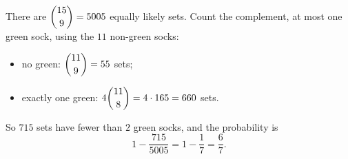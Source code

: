 There are $\dbinom{15}{9}=5005$ equally likely sets. Count the complement, at most one green sock, using the $11$ non-green socks:
\begin{itemize}
\item no green: $\dbinom{11}{9}=55$ sets;
\item exactly one green: $4\dbinom{11}{8}=4\cdot165=660$ sets.
\end{itemize}
So $715$ sets have fewer than $2$ green socks, and the probability is
\[1-\dfrac{715}{5005}=1-\dfrac17=\boxed{\dfrac67}.\]
